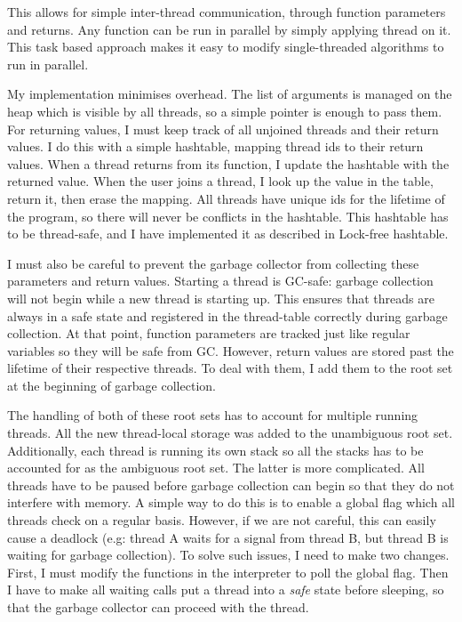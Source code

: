 This allows for simple inter-thread communication, through function parameters and returns. Any function can
be run in parallel by simply applying thread on it. This task based approach makes it easy to modify
single-threaded algorithms to run in parallel.

My implementation minimises overhead. The list of arguments is managed on the heap which is visible by all
threads, so a simple pointer is enough to pass them. For returning values, I must keep track of all
unjoined threads and their return values. I do this with a simple hashtable, mapping thread ids to their
return values. When a thread returns from its function, I update the hashtable with the returned value.
When the user joins a thread, I look up the value in the table, return it, then erase the mapping. All threads
have unique ids for the lifetime of the program, so there will never be conflicts in the hashtable.
This hashtable has to be thread-safe, and I have implemented it as described in Lock-free hashtable.

I must also be careful to prevent the garbage collector from collecting these parameters and return values.
Starting a thread is GC-safe: garbage collection will not begin while a new thread is starting up. This ensures
that threads are always in a safe state and registered in the thread-table correctly during garbage collection.
At that point, function parameters are tracked just like regular variables so they will be safe from GC.
However, return values are stored past the lifetime of their respective threads. To deal with them, I add them
to the root set at the beginning of garbage collection.

The handling of both of these root sets has to account for multiple running threads. All the new
thread-local storage was added to the unambiguous root set. Additionally, each thread is running its
own stack so all the stacks has to be accounted for as the ambiguous root set. The latter is more complicated.
All threads have to be paused before garbage collection can begin so that they do not interfere
with memory. A simple way to do this is to enable a global flag which all threads check on a regular basis.
However, if we are not careful, this can easily cause a deadlock (e.g: thread A waits for a signal from
thread B, but thread B is waiting for garbage collection). To solve such issues, I need to make two
changes. First, I must modify the functions in the interpreter to poll the global flag. Then I have
to make all waiting calls put a thread into a \emph{safe} state before sleeping, so that the garbage collector
can proceed with the thread.


